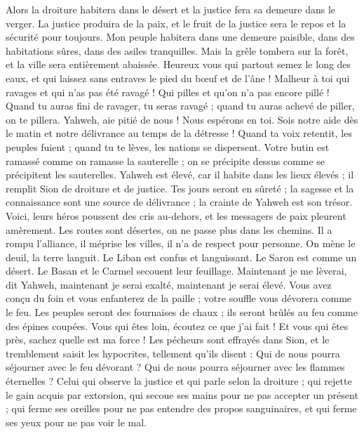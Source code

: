 \begin{multicols}{2}
Alors la droiture habitera dans le désert et la justice fera sa demeure dans le verger.
La justice produira de la paix, et le fruit de la justice sera le repos et la sécurité pour toujours.
Mon peuple habitera dans une demeure paisible, dans des habitations sûres, dans des asiles tranquilles.
Mais la grêle tombera sur la forêt, et la ville sera entièrement abaissée.
Heureux vous qui partout semez le long des eaux, et qui laissez sans entraves le pied du bœuf et de l'âne !
\VerseOne{}Malheur à toi qui ravages et qui n'as pas été ravagé ! Qui pilles et qu'on n'a pas encore pillé ! Quand tu auras fini de ravager, tu seras ravagé ; quand tu auras achevé de piller, on te pillera.
Yahweh, aie pitié de nous ! Nous espérons en toi. Sois notre aide dès le matin et notre délivrance au temps de la détresse !
Quand ta voix retentit, les peuples fuient ; quand tu te lèves, les nations se dispersent.
Votre butin est ramassé comme on ramasse la sauterelle ; on se précipite dessus comme se précipitent les sauterelles.
Yahweh est élevé, car il habite dans les lieux élevés ; il remplit Sion de droiture et de justice.
Tes jours seront en sûreté ; la sagesse et la connaissance sont une source de délivrance ; la crainte de Yahweh est son trésor.
Voici, leurs héros poussent des cris au-dehors, et les messagers de paix pleurent amèrement.
Les routes sont désertes, on ne passe plus dans les chemins. Il a rompu l'alliance, il méprise les villes, il n'a de respect pour personne.
On mène le deuil, la terre languit. Le Liban est confus et languissant. Le Saron est comme un désert. Le Basan et le Carmel secouent leur feuillage.
Maintenant je me lèverai, dit Yahweh, maintenant je serai exalté, maintenant je serai élevé.
Vous avez conçu du foin et vous enfanterez de la paille ; votre souffle vous dévorera comme le feu.
Les peuples seront des fournaises de chaux ; ils seront brûlés au feu comme des épines coupées.
Vous qui êtes loin, écoutez ce que j'ai fait ! Et vous qui êtes près, sachez quelle est ma force !
Les pécheurs sont effrayés dans Sion, et le tremblement saisit les hypocrites, tellement qu'ils disent : Qui de nous pourra séjourner avec le feu dévorant ? Qui de nous pourra séjourner avec les flammes éternelles ?
Celui qui observe la justice et qui parle selon la droiture ; qui rejette le gain acquis par extorsion, qui secoue ses mains pour ne pas accepter un présent ; qui ferme ses oreilles pour ne pas entendre des propos sanguinaires, et qui ferme ses yeux pour ne pas voir le mal.

\end{multicols}
